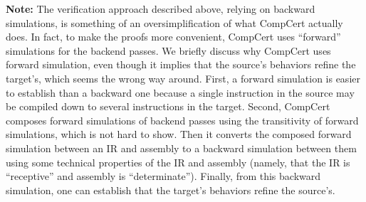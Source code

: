 \textbf{Note:} The verification approach described above, relying on backward simulations, is
something of an oversimplification of what CompCert actually does.  In fact, to make the proofs more
convenient, CompCert uses ``forward'' simulations for the backend passes.  We briefly discuss why
CompCert uses forward simulation, even though it implies that the source's behaviors refine the
target's, which seems the wrong way around.  First, a forward simulation is easier to establish than
a backward one because a single instruction in the source may be compiled down to several
instructions in the target. Second, CompCert composes forward simulations of backend passes using
the transitivity of forward simulations, which is not hard to show. Then it converts the composed
forward simulation between an IR and assembly to a backward simulation between them using some
technical properties of the IR and assembly (namely, that the IR is ``receptive'' and assembly is
``determinate''). Finally, from this backward simulation, one can establish that the target's
behaviors refine the source's.



%

